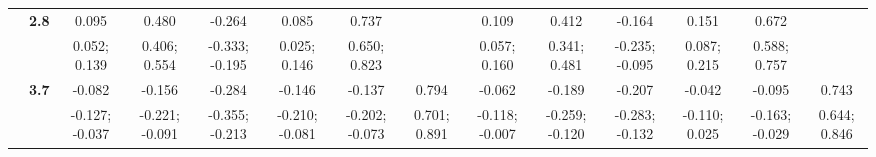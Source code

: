 \begin{landscape}
\begin{table}[!htp]
\begin{center}
\begin{tabular}{>{\bfseries}c>{\bfseries}ccccccccccccc}
 & 2.8 & 0.095 & 0.480 & -0.264 & 0.085 & 0.737 &  & 0.109 & 0.412 & -0.164 & 0.151 & 0.672 & \\
 &  & 0.052; 0.139 & 0.406; 0.554 & -0.333; -0.195 & 0.025; 0.146 & 0.650; 0.823 &  & 0.057; 0.160 & 0.341; 0.481 & -0.235; -0.095 & 0.087; 0.215 & 0.588; 0.757 & \\[0.7ex]
 & 3.7 & -0.082 & -0.156 & -0.284 & -0.146 & -0.137 & 0.794 & -0.062 & -0.189 & -0.207 & -0.042 & -0.095 & 0.743\\
 &  & -0.127; -0.037 & -0.221; -0.091 & -0.355; -0.213 & -0.210; -0.081 & -0.202; -0.073 & 0.701; 0.891 & -0.118; -0.007 & -0.259; -0.120 & -0.283; -0.132 & -0.110; 0.025 & -0.163; -0.029 & 0.644; 0.846\\
\bottomrule
\end{tabular}
\end{center}
\end{table}
\end{landscape}




